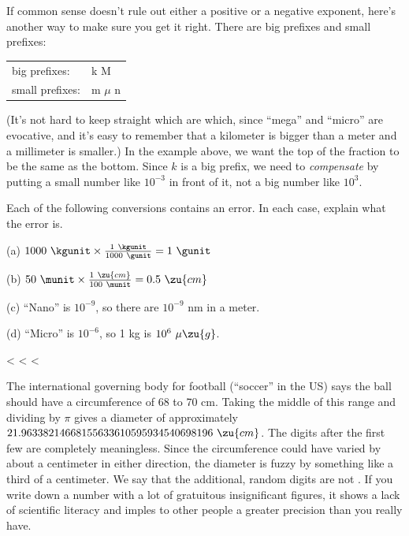 If common sense doesn't rule out either a positive or a
negative exponent, here's another way to make sure you get
it right. There are big prefixes and small prefixes:

\begin{tabular}{ll}
    big prefixes:    & k \quad    M \\
    small prefixes:  &  m  \quad  $\mu$  \quad   n \\
\end{tabular}

\noindent (It's not hard to keep straight which are which, since
``mega'' and ``micro'' are evocative, and it's easy to
remember that a kilometer is bigger than a meter and a
millimeter is smaller.) In the example above, we want the
top of the fraction to be the same as the bottom. Since $k$
is a big prefix, we need to \emph{compensate} by putting a
small number like $10^{-3}$  in front of it, not a big
number like $10^3$.



\startdq

\begin{dq}
Each of the following conversions contains an error.  In
each case, explain what the error is.

(a) $1000\ \kgunit \times \frac{1\ \kgunit}{1000\ \gunit}  = 1\ \gunit$

(b) $50\ \munit \times \frac{1\ \zu{cm}}{100\ \munit}    =  0.5\ \zu{cm}$

(c) ``Nano'' is $10^{-9}$, so there are $10^{-9}$  nm in a meter.

(d) ``Micro'' is $10^{-6}$, so 1 kg is $10^6\ \mu\zu{g}$.

\end{dq}

<%
<%
<%

The international governing body for football (``soccer'' in the US) says
the ball should have a circumference of 68 to 70 cm. Taking the middle of
this range and dividing by $\pi$ gives a diameter of approximately
$21.96338214668155633610595934540698196\ \zu{cm}$.
The digits after the first few are completely meaningless. Since the
circumference could have varied by about a centimeter in either direction,
the diameter is fuzzy by something like a third of a centimeter. We say that
the additional, random digits are not .
If you write down a number with a lot of gratuitous insignificant figures,
it shows a lack of scientific literacy and imples to other people a greater
precision than you really have.

